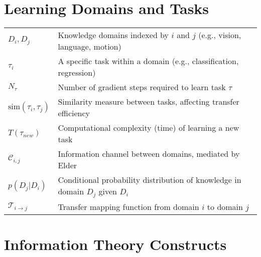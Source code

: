 \section*{Learning Domains and Tasks}

\begin{tabular}{p{3cm} p{12cm}}
$D_i, D_j$ & Knowledge domains indexed by $i$ and $j$ (e.g., vision, language, motion) \\
$\tau_i$ & A specific task within a domain (e.g., classification, regression) \\
$N_{\tau}$ & Number of gradient steps required to learn task $\tau$ \\
$\text{sim}(\tau_i, \tau_j)$ & Similarity measure between tasks, affecting transfer efficiency \\
$T(\tau_{new})$ & Computational complexity (time) of learning a new task \\
$\mathcal{C}_{i,j}$ & Information channel between domains, mediated by Elder \\
$p(D_j|D_i)$ & Conditional probability distribution of knowledge in domain $D_j$ given $D_i$ \\
$\mathcal{T}_{i \to j}$ & Transfer mapping function from domain $i$ to domain $j$ \\
\end{tabular}

\section*{Information Theory Constructs}

